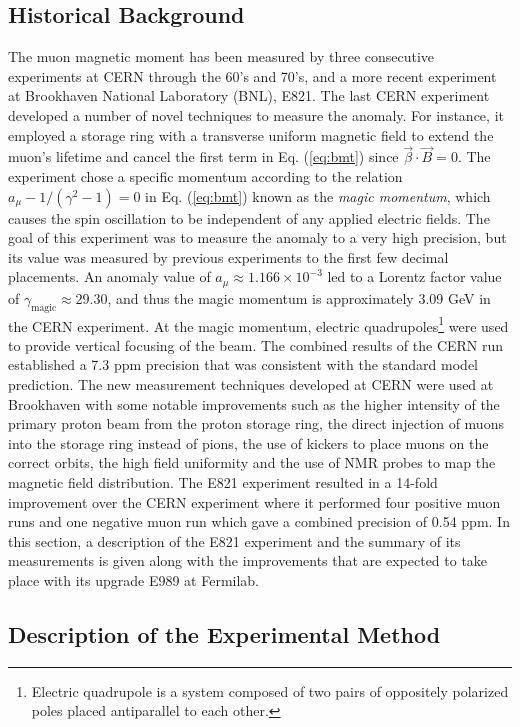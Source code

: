 \documentclass{outhesis}
\begin{document}
\subsection{Historical Background}
The muon magnetic moment has been measured by three consecutive experiments at CERN through the 60's and 70's, and a more recent experiment at Brookhaven National Laboratory (BNL), E821. The last CERN experiment developed a number of novel techniques to measure the anomaly. For instance, it employed a storage ring with a transverse uniform magnetic field to extend the muon's lifetime and cancel the first term in Eq. (\ref{eq:bmt}) since $\overrightarrow{\beta} \cdot \overrightarrow{B} = 0$. The experiment chose a specific momentum according to the relation $a_{\mu} -1/\left(\gamma^2-1\right) = 0$ in Eq.  (\ref{eq:bmt}) known as the \emph{magic momentum}, which causes the spin oscillation to be independent of any applied electric fields. The goal of this experiment was to measure the anomaly to a very high precision, but its value was measured by previous experiments to the first few decimal placements. An anomaly value of $a_{\mu} \approx 1.166\times 10^{-3}$ led to a Lorentz factor value of $\gamma_{\text{magic}} \approx 29.30$, and thus the magic momentum is approximately 3.09 GeV in the CERN experiment. 
At the magic momentum, electric quadrupoles\footnote{Electric quadrupole is a system composed of two pairs of oppositely polarized poles placed antiparallel to each other.} were used to provide vertical focusing of the beam. The combined results of the CERN run established a 7.3 ppm precision that was consistent with the standard model prediction. The new measurement techniques developed at CERN were used at Brookhaven with some notable improvements such as the higher intensity of the primary proton beam from the proton storage ring, the direct injection of muons into the storage ring instead of pions, the use of kickers to place muons on the correct orbits, the  high field uniformity and the use of NMR probes to map the magnetic field distribution. The E821 experiment resulted in a 14-fold improvement over the CERN experiment where it performed four positive muon runs and one negative muon run which gave a combined precision of 0.54 ppm. In this section, a description of the E821 experiment and the summary of its measurements is given along with the improvements that are expected to take place with its upgrade E989 at Fermilab.\\

\subsection{Description of the Experimental Method}
\end{document}
